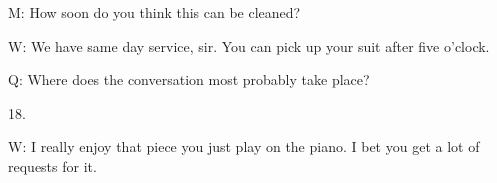 \documentclass[12pt]{article}
\begin{document}
M: How soon do you think this can be cleaned?
\vspace{0.00mm}

\vspace{0.00mm}
\setlength{\parindent}{0.00mm}
\setlength{\leftskip}{-6.23mm}
\setlength{\rightskip}{0.00mm}


\vspace{0.00mm}

\vspace{0.00mm}
\setlength{\parindent}{0.00mm}
\setlength{\leftskip}{-6.23mm}
\setlength{\rightskip}{0.00mm}

W: We have same day service, sir. You can pick up your suit after five o'clock.
\vspace{0.00mm}

\vspace{0.00mm}
\setlength{\parindent}{0.00mm}
\setlength{\leftskip}{-6.23mm}
\setlength{\rightskip}{0.00mm}


\vspace{0.00mm}

\vspace{0.00mm}
\setlength{\parindent}{0.00mm}
\setlength{\leftskip}{-6.23mm}
\setlength{\rightskip}{0.00mm}

Q: Where does the conversation most probably take place?
\vspace{0.00mm}

\vspace{0.00mm}
\setlength{\parindent}{0.00mm}
\setlength{\leftskip}{-6.23mm}
\setlength{\rightskip}{0.00mm}


\vspace{0.00mm}

\vspace{0.00mm}
\setlength{\parindent}{0.00mm}
\setlength{\leftskip}{-6.23mm}
\setlength{\rightskip}{0.00mm}

18.
\vspace{0.00mm}

\vspace{0.00mm}
\setlength{\parindent}{0.00mm}
\setlength{\leftskip}{-6.23mm}
\setlength{\rightskip}{0.00mm}


\vspace{0.00mm}

\vspace{0.00mm}
\setlength{\parindent}{0.00mm}
\setlength{\leftskip}{-6.23mm}
\setlength{\rightskip}{0.00mm}

W: I really enjoy that piece you just play on the piano. I bet you get a lot of requests for it.
\vspace{0.00mm}
\end{document}
